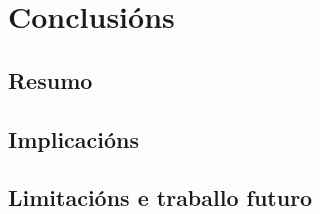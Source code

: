 
\chapter{Conclusións}
\label{sec:conclusion}

{
\color{gray}
\Blindtext[2][1]
}
\section{Resumo}
\label{sec:conclusion:sec1}
{
\color{gray}
\Blindtext[2][2]
}

\section{Implicacións}
\label{sec:conclusion:sec2}
{
\color{gray}
\Blindtext[3][2]
}

\section{Limitacións e traballo futuro}
\label{sec:conclusion:future}
{
\color{gray}
\Blindtext[2][2]
}